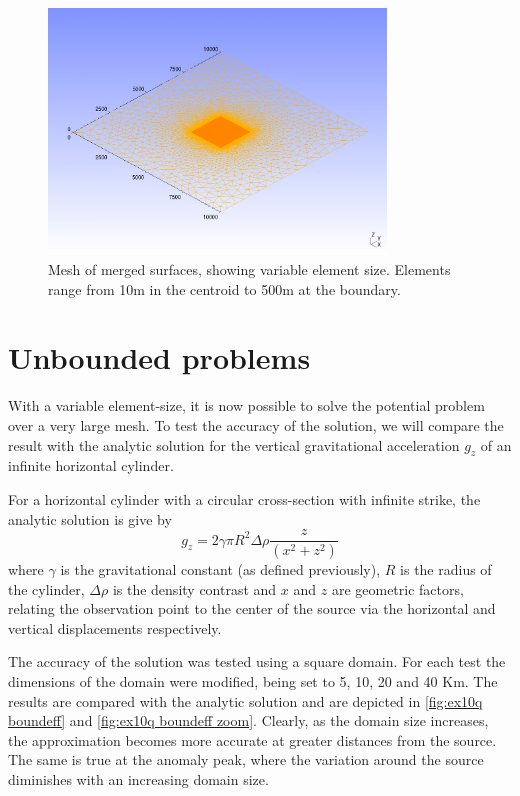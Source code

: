 \begin{figure}[ht]
\centering
\includegraphics[width=0.8\textwidth]{figures/ex10m_msh.png}
\caption{Mesh of merged surfaces, showing variable element size. Elements
range from 10m in the centroid to 500m at the boundary.}
\label{fig:ex10mmsh}
\end{figure}
\clearpage

\section{Unbounded problems}
With a variable element-size, it is now possible to solve the potential problem
over a very large mesh. To test the accuracy of the solution, we will compare
the \esc result with the analytic solution for the vertical gravitational
acceleration $g_z$ of an infinite horizontal cylinder.

For a horizontal cylinder with a circular cross-section with infinite strike,
the analytic solution is give by
\begin{equation}
g_z = 2\gamma\pi R^2 \Delta\rho \frac{z}{(x^2+z^2)} 
\end{equation}
where $\gamma$ is the gravitational constant (as defined previously), $R$ is the
radius of the cylinder, $\Delta\rho$ is the density contrast and $x$ and $z$ are
geometric factors, relating the observation point to the center of the source
via the horizontal and vertical displacements respectively.

The accuracy of the solution was tested using a square domain. For each test the
dimensions of the domain were modified, being set to 5, 10, 20 and 40 Km. The
results are compared with the analytic solution and are depicted in
\autoref{fig:ex10q boundeff} and \autoref{fig:ex10q boundeff zoom}. Clearly, as
the domain size increases, the \esc approximation becomes more accurate at
greater distances from the source. The same is true at the anomaly peak, where
the variation around the source diminishes with an increasing domain size.

